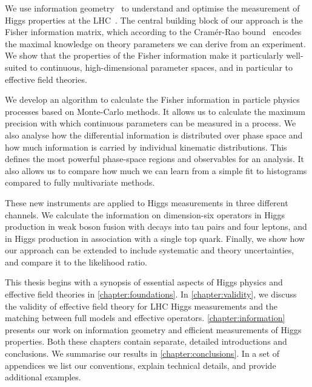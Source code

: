 %
We use information geometry~\cite{efron1975, amari1982, amari2000joho}
to understand and optimise the measurement of Higgs properties at the
LHC~\cite{Brehmer:2016nyr}.
%
The central building block of our approach is the Fisher information
matrix, which according to the Cram\'er-Rao bound~\cite{Rao:1945,
  Cramer:1946} encodes the maximal knowledge on theory parameters we
can derive from an experiment. We show that the properties of the
Fisher information make it particularly well-suited to continuous,
high-dimensional parameter spaces, and in particular to effective
field theories.

We develop an algorithm to calculate the Fisher information in
particle physics processes based on Monte-Carlo methods. It allows us
to calculate the maximum precision with which continuous parameters
can be measured in a process. We also analyse how the differential
information is distributed over phase space and how much information
is carried by individual kinematic distributions. This defines the
most powerful phase-space regions and observables for an analysis. It
also allows us to compare how much we can learn from a simple fit to
histograms compared to fully multivariate methods.

These new instruments are applied to Higgs measurements in three
different channels. We calculate the information on dimension-six
operators in Higgs production in weak boson fusion with decays into
tau pairs and four leptons, and in Higgs production in association
with a single top quark. Finally, we show how our approach can be
extended to include systematic and theory uncertainties, and compare
it to the likelihood ratio.

\newparagraph
%
This thesis begins with a synopsis of essential aspects of Higgs
physics and effective field theories in
\autoref{chapter:foundations}. In \autoref{chapter:validity}, we
discuss the validity of effective field theory for LHC Higgs
measurements and the matching between full models and effective
operators. \autoref{chapter:information} presents our work on
information geometry and efficient measurements of Higgs
properties. Both these chapters contain separate, detailed
introductions and conclusions. We summarise our results in
\autoref{chapter:conclusions}. In a set of appendices we list our
conventions, explain technical details, and provide additional
examples.
